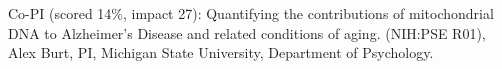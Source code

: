 

\item Co-PI (scored 14\%, impact 27): Quantifying the contributions of mitochondrial DNA to Alzheimer's Disease and related conditions of aging. (NIH:PSE R01), Alex Burt, PI, Michigan State University, Department of Psychology.  %

